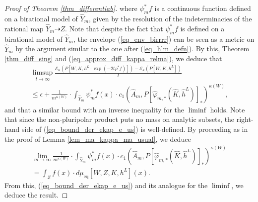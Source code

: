 \documentclass[12pt]{article}
\numberwithin{equation}{section}
\theoremstyle{theorem}
\theoremstyle{definition}
\theoremstyle{remark}
\begin{document}
\begin{proof}[Proof of Theorem \ref{thm_differentiab}]
		where $\psi_m^* f$ is a continuous function defined on a birational model of $\widehat{Y}_m$, given by the resolution of the indeterminacies of the rational map $\widehat{Y}_m \dashrightarrow Z$.
		Note that despite the fact that $\psi_m^* f$ is defined on a birational model of $\widehat{Y}_m$, the envelope (\ref{eq_env_birrrr}) can be seen as a metric on $\widehat{Y}_m$ by the argument similar to the one after (\ref{eq_hlm_defn}).
		By this, Theorem \ref{thm_diff_sing} and (\ref{eq_approx_diff_kappa_relma}), we deduce that 
		\begin{multline}\label{eq_bound_der_ekap_e_us}
			\limsup_{t \to \infty}
			\frac{\mathscr{E}_{\kappa}(P[W, K, h^L \cdot \exp(- 2 t \rho^* f)])
				-
				\mathscr{E}_{\kappa}(P[W, K, h^L])}{t}
			\\
			\leq
			\epsilon 
			+
			\frac{1}{m^{\kappa(W)}} \cdot
			\int_{\widehat{Y}_m} \psi_m^* f(x) \cdot c_1(\widehat{A}_m, P[\widehat{\varphi}_{m, *} (\widehat{K}, \widehat{h}^L)]_*)^{\kappa(W)},
		\end{multline}		 
		and that a similar bound with an inverse inequality for the $\liminf$ holds.
		Note that since the non-pluripolar product puts no mass on analytic subsets, the right-hand side of (\ref{eq_bound_der_ekap_e_us}) is well-defined.
		By proceeding as in the proof of Lemma \ref{lem_ma_kappa_ma_usual}, we deduce
		\begin{multline}
			\lim_{m \to \infty}
			\frac{1}{m^{\kappa(W)}} \cdot
			\int_{\widehat{Y}_m} \psi_m^* f(x) \cdot c_1(\widehat{A}_m, P[\widehat{\varphi}_{m, *} (\widehat{K}, \widehat{h}^L)]_*)^{\kappa(W)}
			\\
			=
			\int_Z  f(x) \cdot d \mu_{\mathrm{eq}}[W, Z, K, h^L](x).
		\end{multline}
		From this, (\ref{eq_bound_der_ekap_e_us}) and its analogue for the $\liminf$, we deduce the result.
	\end{proof}
	
	
\end{document}
